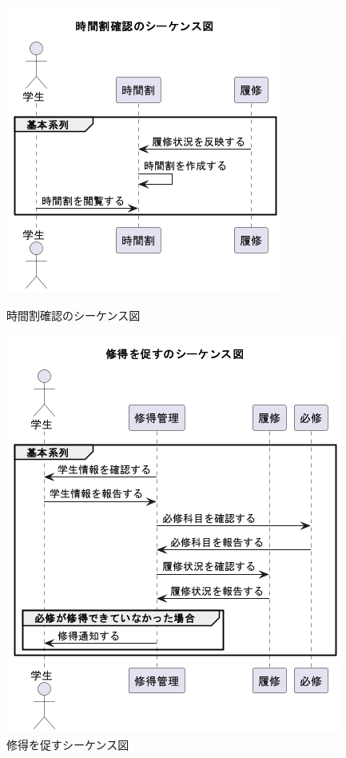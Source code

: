 \documentclass[documentclass]{jsarticle}
\begin{document}
\begin{figure}[H]
  \centering
  \begin{minipage}[b]{0.49\columnwidth}
      \centering
      \includegraphics[width=0.7\columnwidth]{figure/6-3.png}
      \caption{時間割確認のシーケンス図}
      \label{fig:6-3}
  \end{minipage}
  \begin{minipage}[b]{0.49\columnwidth}
      \centering
      \includegraphics[width=0.7\columnwidth]{figure/6-5.png}
      \caption{修得を促すシーケンス図}
      \label{fig:6-5}
  \end{minipage}
\end{figure}
\end{document}
